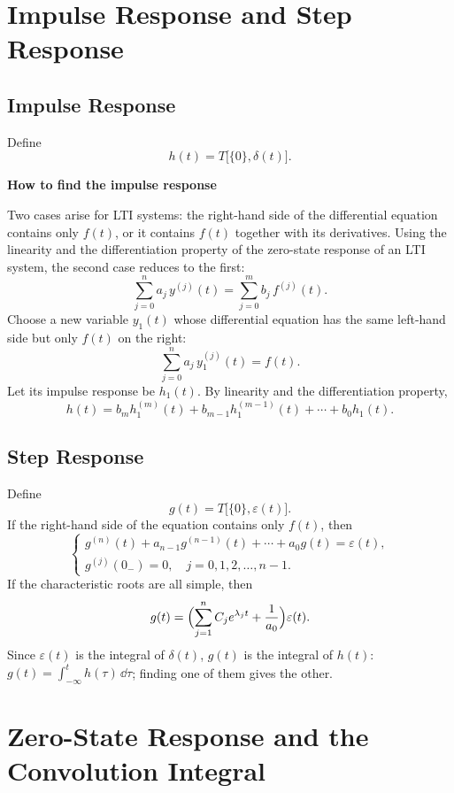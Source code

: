 \section{Impulse Response and Step Response}

\subsection{Impulse Response}

Define
\[
    h(t)=T\bigl[\{0\},\delta(t)\bigr].
\]

\textbf{How to find the impulse response}

Two cases arise for LTI systems: the right-hand side of the differential
equation contains only $f(t)$, or it contains $f(t)$ together with its
derivatives. Using the linearity and the differentiation property of the
zero-state response of an LTI system, the second case reduces to the first:
\[
    \sum_{j=0}^{n}a_j\,y^{(j)}(t)=\sum_{j=0}^{m}b_j\,f^{(j)}(t).
\]
Choose a new variable $y_1(t)$ whose differential equation has the same
left-hand side but only $f(t)$ on the right:
\[
    \sum_{j=0}^{n}a_j\,y_1^{(j)}(t)=f(t).
\]
Let its impulse response be $h_1(t)$. By linearity and the differentiation
property,
\[
    h(t)=b_m h_1^{(m)}(t)+b_{m-1}h_1^{(m-1)}(t)+\cdots+b_0 h_1(t).
\]

\subsection{Step Response}

Define
\[
    g(t)=T\bigl[\{0\},\varepsilon(t)\bigr].
\]
If the right-hand side of the equation contains only $f(t)$, then
\[
    \begin{cases}
        g^{(n)}(t)+a_{n-1}g^{(n-1)}(t)+\cdots+a_0g(t)=\varepsilon(t),\\[4pt]
        g^{(j)}(0_{-})=0,\quad j=0,1,2,\dots,n-1 .
    \end{cases}
\]
If the characteristic roots are all simple, then
\[
    g(t)=\Bigl(\sum_{j=1}^{n}C_j e^{\lambda_j t}+\frac{1}{a_0}\Bigr)\varepsilon(t).
\]
Since $\varepsilon(t)$ is the integral of $\delta(t)$, $g(t)$ is the integral
of $h(t)$: $g(t)=\displaystyle\int_{-\infty}^{t}h(\tau)\,\dd\tau$; finding one
of them gives the other.

\section{Zero-State Response and the Convolution Integral}

